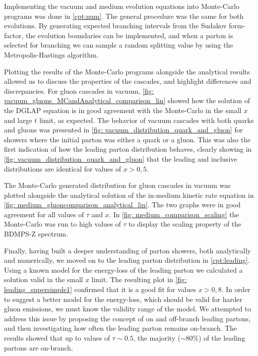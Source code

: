 \documentclass[main.tex]{subfiles}
\begin{document}
Implementing the vacuum and medium evolution equations into Monte-Carlo programs was done in \autoref{cpt:num}. The general procedure was the same for both evolutions. By generating expected branching intervals from the Sudakov form-factor, the evolution boundaries can be implemented, and when a parton is selected for branching we can sample a random splitting value by using the Metropolis-Hastings algorithm.

Plotting the results of the Monte-Carlo programs alongside the analytical results allowed us to discuss the properties of the cascades, and highlight differences and discrepancies. For gluon cascades in vacuum, \autoref{fig: vacuum_gluons_MCandAnalytical_comparison_lin} showed how the solution of the DGLAP equation is in good agreement with the Monte-Carlo in the small \(x\) and large \(t\) limit, as expected. The behavior of vacuum cascades with both quarks and gluons was presented in \autoref{fig: vacuum_distribution_quark_and_gluon} for showers where the initial parton was either a quark or a gluon. This was also the first indication of how the leading parton distribution behaves, clearly showing in \autoref{fig: vacuum_distribution_quark_and_gluon} that the leading and inclusive distributions are identical for values of \(x>0,5\). 

The Monte-Carlo generated distribution for gluon cascades in vacuum was plotted alongside the analytical solution of the in-medium kinetic rate equation in \autoref{fig: medium_gluoncomparison_analytical_lin}. The two graphs were in good agreement for all values of \(\tau\) and \(x\). In \autoref{fig: medium_comparison_scaling} the Monte-Carlo was run to high values of \(\tau\) to display the scaling property of the BDMPS-Z spectrum.

Finally, having built a deeper understanding of parton showers, both analytically and numerically, we moved on to the leading parton distribution in \autoref{cpt:leading}. Using a known model for the energy-loss of the leading parton we calculated a solution valid in the small \(x\) limit. The resulting plot in \autoref{fig: leading_supersimple1} confirmed that it is a good fit for values \(x>0,8\). In order to suggest a better model for the energy-loss, which should be valid for harder gluon emissions, we must know the validity range of the model. We attempted to address this issue by proposing the concept of on and off-branch leading partons, and then investigating how often the leading parton remains on-branch. The results showed that up to values of \(\tau \sim 0.5\), the majority (\(\sim 80\%\)) of the leading partons are on-branch. 
\end{document}
